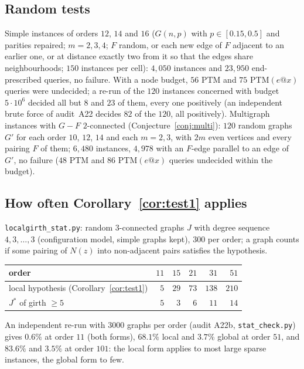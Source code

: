 \documentclass[11pt]{amsart}
\theoremstyle{definition}
\begin{document}
\subsection*{Random tests}
Simple instances of orders $12$, $14$ and $16$ ($G(n,p)$ with $p\in[0.15,0.5]$ and parities
repaired; $m=2,3,4$; $F$ random, or each new edge of $F$ adjacent to an earlier one, or at
distance exactly two from it so that the edges share neighbourhoods; $150$ instances per cell):
$4{,}050$ instances and $23{,}950$ end-prescribed queries, no failure. With a node budget,
$56$ PTM and $75$ PTM$(e@x)$ queries were undecided; a re-run of the $120$ instances concerned
with budget $5\cdot10^6$ decided all but $8$ and $23$ of them, every one positively (an
independent brute force of audit~A22 decides $82$ of the $120$, all positively). Multigraph
instances with $G-F$ $2$-connected (Conjecture~\ref{conj:multi}): $120$ random graphs $G'$ for
each order $10$, $12$, $14$ and each $m=2,3$, with $2m$ even vertices and every pairing $F$ of
them; $6{,}480$ instances, $4{,}978$ with an $F$-edge parallel to an edge of $G'$, no failure
($48$ PTM and $86$ PTM$(e@x)$ queries undecided within the budget).

\subsection*{How often Corollary~\ref{cor:test1} applies}
\texttt{localgirth\_stat.py}: random $3$-connected graphs $J$ with degree sequence $4,3,\dots,3$
(configuration model, simple graphs kept), $300$ per order; a graph counts if some pairing of
$N(z)$ into non-adjacent pairs satisfies the hypothesis.
\begin{center}\footnotesize
\begin{tabular}{@{}lrrrrr@{}}
\toprule
order & $11$ & $15$ & $21$ & $31$ & $51$\\
\midrule
local hypothesis (Corollary~\ref{cor:test1}) & $5$ & $29$ & $73$ & $138$ & $210$\\
$J^\ast$ of girth $\ge5$ & $5$ & $3$ & $6$ & $11$ & $14$\\
\bottomrule
\end{tabular}
\end{center}
An independent re-run with $3000$ graphs per order (audit A22b, \texttt{stat\_check.py}) gives
$0.6\%$ at order $11$ (both forms), $68.1\%$ local and $3.7\%$ global at order $51$, and $83.6\%$
and $3.5\%$ at order $101$: the local form applies to most large sparse instances, the global
form to few.
\end{document}
